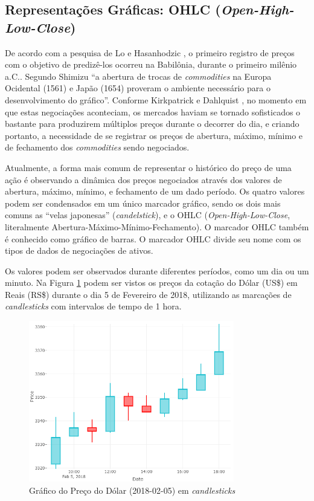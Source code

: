 \documentclass[12pt]{article}
\begin{document}
\subsection{Representações Gráficas: OHLC (\textit{Open-High-Low-Close})} \label{sec:OHLC}

De acordo com a pesquisa de Lo e Hasanhodzic \cite{LoHasanhodzic:2010}, o primeiro registro
de preços com o objetivo de predizê-los ocorreu na Babilônia, durante o primeiro milênio a.C..
Segundo Shimizu \cite{Shimizu:1986} ``a abertura de trocas de \textit{commodities} na
Europa Ocidental (1561) e Japão (1654) proveram o ambiente necessário para o desenvolvimento
do gráfico''. Conforme Kirkpatrick e Dahlquist \cite{KirkpatrickDahlquist:2006},
no momento em que estas negociações aconteciam, os mercados haviam se tornado sofisticados
o bastante para produzirem múltiplos preços durante o decorrer do dia, e criando portanto,
a necessidade de se registrar os preços de abertura, máximo, mínimo e de fechamento dos
\textit{commodities} sendo negociados.

Atualmente, a forma mais comum de representar o histórico do preço de uma ação é observando
a dinâmica dos preços negociados através dos valores de abertura, máximo, mínimo, e fechamento
de um dado período.
Os quatro valores podem ser condensados em um único marcador gráfico, sendo os dois mais
comuns as ``velas japonesas'' (\textit{candelstick}), e o OHLC (\textit{Open-High-Low-Close},
literalmente Abertura-Máximo-Mínimo-Fechamento). O marcador OHLC também é conhecido como
gráfico de barras. O marcador OHLC divide seu nome com os tipos de dados de negociações de
ativos.

Os valores podem ser observados durante diferentes períodos, como um dia ou um minuto.
Na Figura \ref{fig:candlestick_chart} podem ser vistos os preços da cotação do Dólar (US\$)
em Reais (RS\$) durante o dia 5 de Fevereiro de 2018, utilizando as marcações de
\textit{candlesticks} com intervalos de tempo de 1 hora.

\begin{figure}[H]
	\centering
	\includegraphics[width=0.8\textwidth]{candlestick_chart.png}
	\caption{Gráfico do Preço do Dólar (2018-02-05) em \textit{candlesticks}}
	\label{fig:candlestick_chart}
\end{figure}
\end{document}
